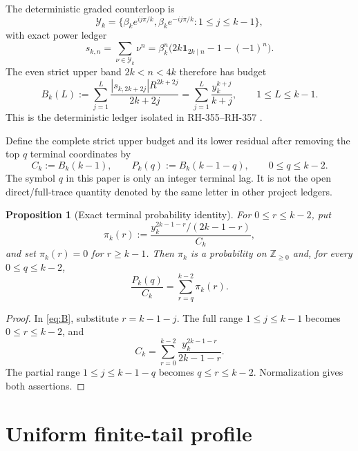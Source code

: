 \documentclass[11pt]{article}
\newtheorem{proposition}[theorem]{Proposition}
\theoremstyle{remark}
\newcommand{\one}{\mathbf 1}
\begin{document}
The deterministic graded counterloop is
\begin{equation}\label{eq:Y}
 \mathcal Y_k=
 \{\beta_ke^{ij\pi/k},\beta_ke^{-ij\pi/k}:1\le j\le k-1\},
\end{equation}
with exact power ledger
\begin{equation}\label{eq:s-ledger}
 s_{k,n}=\sum_{\nu\in\mathcal Y_k}\nu^n
 =\beta_k^n\bigl(2k\one_{2k\mid n}-1-(-1)^n\bigr).
\end{equation}
The even strict upper band $2k<n<4k$ therefore has budget
\begin{equation}\label{eq:B}
 B_k(L):=\sum_{j=1}^{L}
 \frac{|s_{k,2k+2j}|R^{2k+2j}}{2k+2j}
 =\sum_{j=1}^{L}\frac{y_k^{k+j}}{k+j},
 \qquad 1\le L\le k-1.
\end{equation}
This is the deterministic ledger isolated in RH-355--RH-357
\citep{WangUpperBurden2026,WangMesoscopic2026,WangLinearDepth2026}.

Define the complete strict upper budget and its lower residual after removing
the top $q$ terminal coordinates by
\begin{equation}\label{eq:C-P}
 C_k:=B_k(k-1),\qquad
 P_k(q):=B_k(k-1-q),\qquad 0\le q\le k-2.
\end{equation}
The symbol $q$ in this paper is only an integer terminal lag.  It is not the
open direct/full-trace quantity denoted by the same letter in other project
ledgers.

\begin{proposition}[Exact terminal probability identity]\label{prop:exact}
For $0\le r\le k-2$, put
\begin{equation}\label{eq:pi}
 \pi_k(r):=
 \frac{y_k^{2k-1-r}/(2k-1-r)}{C_k},
\end{equation}
and set $\pi_k(r)=0$ for $r\ge k-1$.  Then $\pi_k$ is a probability on
$\mathbb Z_{\ge0}$ and, for every $0\le q\le k-2$,
\begin{equation}\label{eq:tail-identity}
 \boxed{\frac{P_k(q)}{C_k}=\sum_{r=q}^{k-2}\pi_k(r).}
\end{equation}
\end{proposition}

\begin{proof}
In \eqref{eq:B}, substitute $r=k-1-j$.  The full range
$1\le j\le k-1$ becomes $0\le r\le k-2$, and
\[
 C_k=\sum_{r=0}^{k-2}\frac{y_k^{2k-1-r}}{2k-1-r}.
\]
The partial range $1\le j\le k-1-q$ becomes $q\le r\le k-2$.
Normalization gives both assertions.
\end{proof}

\section{Uniform finite-tail profile}
\end{document}
